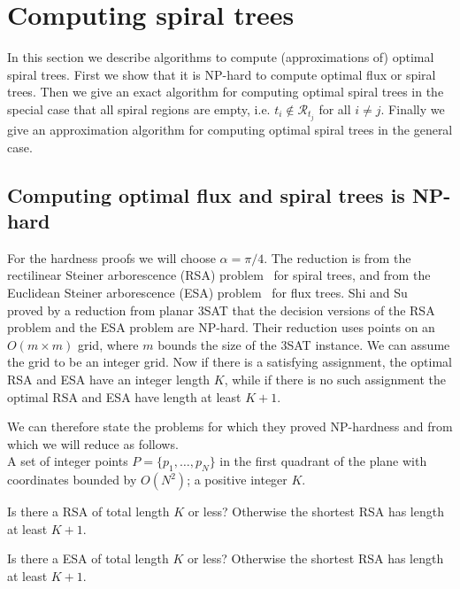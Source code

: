 \documentclass{journalA4}
\begin{document}
\section{Computing spiral trees} \label{sec:computespirals}

In this section we describe algorithms to compute (approximations of) optimal spiral trees. First we show that it is NP-hard to compute optimal flux or spiral trees. Then we give an exact algorithm for computing optimal spiral trees in the special case that all spiral regions are empty, i.e. $t_i \notin \mathcal{R}_{t_j}$ for all $i \neq j$. Finally we give an approximation algorithm for computing optimal spiral trees in the general case.

\subsection{Computing optimal flux and spiral trees is NP-hard}\label{sec:npproof}

For the hardness proofs we will choose $\alpha = \pi/4$. The reduction is from the rectilinear Steiner arborescence (RSA) problem~\cite{ss-rsap-05} for spiral trees, and
from the Euclidean Steiner arborescence (ESA) problem~\cite{Shi2000} for flux trees.
Shi and Su~\cite{ss-rsap-05} proved by a reduction from planar 3SAT that the decision versions of the RSA problem and the ESA problem are NP-hard. Their reduction uses points on an $O(m \times m)$ grid, where $m$ bounds the size of the 3SAT instance. We can assume the grid to be an integer grid. Now if there is a satisfying assignment, the optimal RSA and ESA have an integer length $K$, while if there is no such assignment the optimal RSA and ESA have length at least $K+1$.

We can therefore state the problems for which they proved NP-hardness and from which we will reduce as follows.
\\
 A set of integer points $P = \{ p_1,\ldots, p_N \}$ in the first quadrant of the plane with coordinates bounded by $O(N^2)$; a positive integer $K$.

 Is there a RSA of total length $K$ or less? Otherwise the shortest RSA has length at least $K+1$.

 Is there a ESA of total length $K$ or less? Otherwise the shortest RSA has length at least $K+1$.
\end{document}
